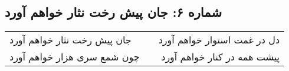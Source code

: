 \begin{center}
\section*{شماره ۶: جان پیش رخت نثار خواهم آورد}
\label{sec:006}
\begin{longtable}{l p{0.5cm} r}
جان پیش رخت نثار خواهم آورد
&&
دل در غمت استوار خواهم آورد
\\
چون شمع سری هزار خواهم آورد
&&
پیشت همه در کنار خواهم آورد
\\
\end{longtable}
\end{center}
